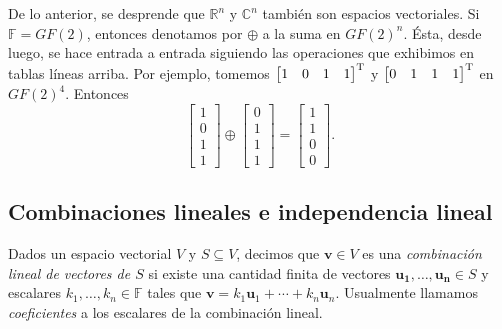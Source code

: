             De lo anterior, se desprende que  $\mathbb{R}^{n}$ y $\mathbb{C}^{n}$ también  son espacios vectoriales. Si $\mathbb{F} = GF(2)$, entonces denotamos por $\oplus$ a la suma en $GF(2)^{n}$. Ésta, desde luego, se hace entrada a entrada siguiendo las operaciones que exhibimos en tablas líneas arriba. Por ejemplo, tomemos $\begin{bmatrix} 1 & 0 & 1 & 1 \end{bmatrix}^{\textnormal{T}}$ y $\begin{bmatrix} 0 & 1 & 1 & 1 \end{bmatrix}^\textnormal{T}$ en $GF(2)^{4}$. Entonces 
                $$ \begin{bmatrix}
                1 \\
                0 \\
                1\\
                1
                \end{bmatrix} \oplus \begin{bmatrix}
                0 \\
                1\\
                1\\
                1
                \end{bmatrix}  =\begin{bmatrix}
                1 \\
                1 \\
                0\\
                0
                \end{bmatrix}.
                $$


        \subsection{Combinaciones lineales e independencia lineal}
            Dados un  espacio vectorial $V$ y $S \subseteq V$, decimos que $\mathbf{v} \in V$ es una \textit{combinación lineal de vectores de $S$}  si existe una cantidad finita de vectores $\mathbf{u_{1}, \ldots, u_{n}} \in S$ y escalares $k_{1}, \ldots, k_{n}\in \mathbb{F}$ tales que $\mathbf{v} = k_{1}\mathbf{u}_{1} + \cdots + k_{n}\mathbf{u}_{n}$. Usualmente llamamos \textit{coeficientes} a los escalares de la combinación lineal.

